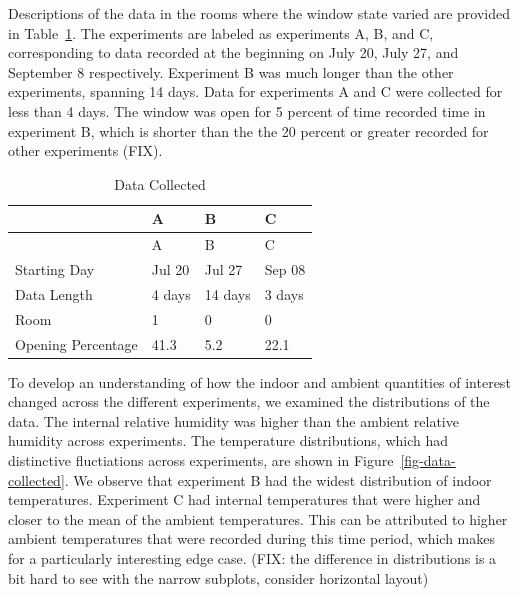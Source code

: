 \documentclass[sigconf]{acmart}
\begin{document}
Descriptions of the data in the rooms where the window state varied are
provided in Table~\ref{tbl-data-collected}. The experiments are labeled
as experiments A, B, and C, corresponding to data recorded at the
beginning on July 20, July 27, and September 8 respectively. Experiment
B was much longer than the other experiments, spanning 14 days. Data for
experiments A and C were collected for less than 4 days. The window was
open for 5 percent of time recorded time in experiment B, which is
shorter than the the 20 percent or greater recorded for other
experiments (FIX).

\hypertarget{tbl-data-collected}{}
\begin{longtable}[]{@{}llll@{}}
\caption{\label{tbl-data-collected}Data Collected}\tabularnewline
\toprule()
& A & B & C \\
\midrule()
\endfirsthead
\toprule()
& A & B & C \\
\midrule()
\endhead
Starting Day & Jul 20 & Jul 27 & Sep 08 \\
Data Length & 4 days & 14 days & 3 days \\
Room & 1 & 0 & 0 \\
Opening Percentage & 41.3 & 5.2 & 22.1 \\
\bottomrule()
\end{longtable}

To develop an understanding of how the indoor and ambient quantities of
interest changed across the different experiments, we examined the
distributions of the data. The internal relative humidity was higher
than the ambient relative humidity across experiments. The temperature
distributions, which had distinctive fluctiations across experiments,
are shown in Figure~\ref{fig-data-collected}. We observe that experiment
B had the widest distribution of indoor temperatures. Experiment C had
internal temperatures that were higher and closer to the mean of the
ambient temperatures. This can be attributed to higher ambient
temperatures that were recorded during this time period, which makes for
a particularly interesting edge case. (FIX: the difference in
distributions is a bit hard to see with the narrow subplots, consider
horizontal layout)
\end{document}
